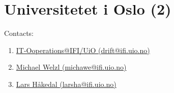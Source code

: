 \section{Universitetet i Oslo (2)}
\label{sec:UiO}

Contacts:
\begin{enumerate}
 \item {}\href{mailto:drift@ifi.uio.no}{IT-Ooperations@IFI/UiO (drift@ifi.uio.no)}
 \item {}\href{mailto:michawe@ifi.uio.no}{Michael Welzl (michawe@ifi.uio.no)}
 \item {}\href{mailto:larsha@ifi.uio.no}{Lars Håkedal (larsha@ifi.uio.no)}
\end{enumerate}

